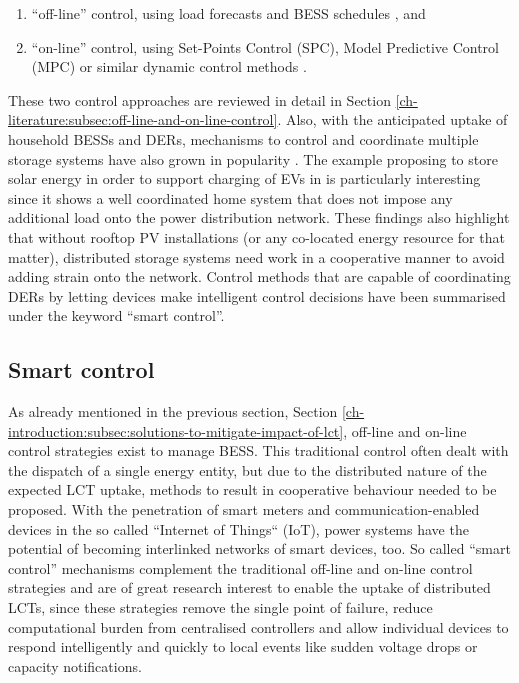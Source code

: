 \begin{enumerate}
	\item ``off-line'' control, using load forecasts and BESS schedules \cite{Cecati2011, Chaouachi2013, Palma-Behnke2013, Khodaei2014}, and
	\item ``on-line'' control, using Set-Points Control (SPC), Model Predictive Control (MPC) or similar dynamic control methods \cite{Salinas2013, Huang2013, Huang2014a, Sun2014a}.
\end{enumerate}

These two control approaches are reviewed in detail in Section \ref{ch-literature:subsec:off-line-and-on-line-control}.
Also, with the anticipated uptake of household BESSs and DERs, mechanisms to control and coordinate multiple storage systems have also grown in popularity \cite{Mokhtari2013, Sarker2015, Baker2016a, Baumann2017}.
The example proposing to store solar energy in order to support charging of EVs in \cite{Baumann2017} is particularly interesting since it shows a well coordinated home system that does not impose any additional load onto the power distribution network.
These findings also highlight that without rooftop PV installations (or any co-located energy resource for that matter), distributed storage systems need work in a cooperative manner to avoid adding strain onto the network.
Control methods that are capable of coordinating DERs by letting devices make intelligent control decisions have been summarised under the keyword ``smart control''.

\subsection{Smart control}
\label{ch-introduction:subsec:smart-control}


As already mentioned in the previous section, Section \ref{ch-introduction:subsec:solutions-to-mitigate-impact-of-lct}, off-line and on-line control strategies exist to manage BESS.
This traditional control often dealt with the dispatch of a single energy entity, but due to the distributed nature of the expected LCT uptake, methods to result in cooperative behaviour needed to be proposed.
With the penetration of smart meters and communication-enabled devices in the so called ``Internet of Things`` (IoT), power systems have the potential of becoming interlinked networks of smart devices, too.
So called ``smart control'' mechanisms complement the traditional off-line and on-line control strategies and are of great research interest to enable the uptake of distributed LCTs, since these strategies remove the single point of failure, reduce computational burden from centralised controllers and allow individual devices to respond intelligently and quickly to local events like sudden voltage drops or capacity notifications.

